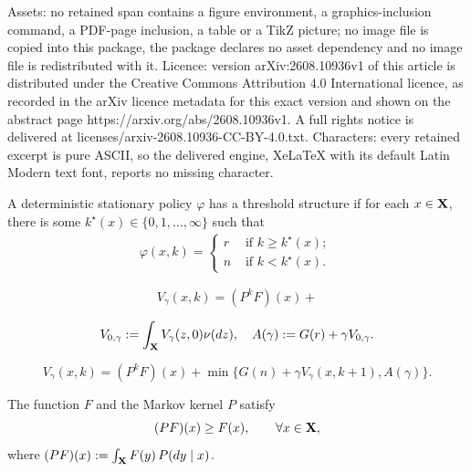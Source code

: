 \documentclass[10pt,a4paper]{amsart}
\begin{document}
Assets: no retained span contains a figure environment, a graphics-inclusion command, a PDF-page inclusion, a table or a TikZ picture; no image file is copied into this package, the package declares no asset dependency and no image file is redistributed with it. Licence: version arXiv:2608.10936v1 of this article is distributed under the Creative Commons Attribution 4.0 International licence, as recorded in the arXiv licence metadata for this exact version and shown on the abstract page https://arxiv.org/abs/2608.10936v1. A full rights notice is delivered at licenses/arxiv-2608.10936-CC-BY-4.0.txt. Characters: every retained excerpt is pure ASCII, so the delivered engine, XeLaTeX with its default Latin Modern text font, reports no missing character.
\begin{definition}
\label{Kostia2026Def01} A deterministic stationary policy $\varphi$ has a threshold structure if for each $x\in {\bf X}$, there is some $k^{\star}(x)\in\{0,1,\dots,\infty\}$ such that 
\begin{align}\label{Kostia2026Eqn11}
\varphi(x,k)=\begin{cases}
r & \mbox{ if $k\ge k^{\star}(x)$; }\\
n & \mbox{ if $k<k^{\star}(x)$.} 
\end{cases}
\end{align} 
\end{definition}

\begin{equation}
\label{eq:Bellman_xk}
{V_\gamma}(x,k) = (P^kF)(x) +
\end{equation}

\begin{equation}
\label{eq:A_def}
{V_{0,\gamma}} := {\int_{{\bf X}}V_\gamma(z,0)\nu(dz)},
\quad
{A(\gamma)}:= G(r)+\gamma V_{0,\gamma}.
\end{equation}

\begin{equation}
\label{eq:Bellman_xk_simplified}
V_\gamma(x,k) = (P^kF)(x) + \min\{ G(n)+\gamma V_\gamma(x,k+1), {A(\gamma)} \}.
\end{equation}

\begin{assumption}
\label{ass:PFgeF}
The function $F$ and the Markov kernel $P$ satisfy
\begin{equation}
\label{eq:PFgeF}
(PF)(x) \ge F(x), \qquad \forall x\in {\bf X},
\end{equation}
where $(PF)(x):=\int_{\bf X} F(y)\,P(dy \mid x)$.
\end{assumption}
\end{document}
